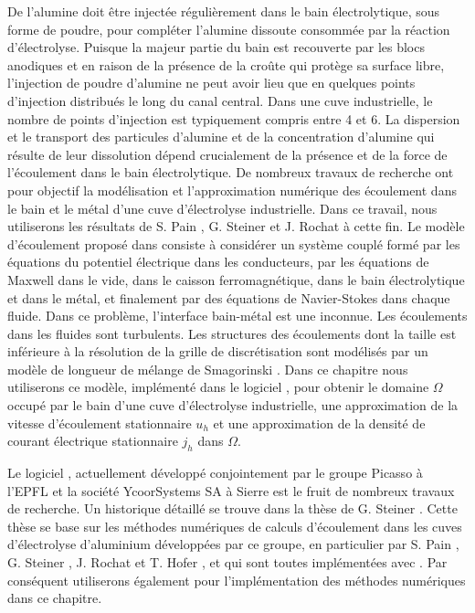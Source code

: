 De l'alumine doit être injectée régulièrement dans le bain
électrolytique, sous forme de poudre, pour compléter l'alumine
dissoute consommée par la réaction d'électrolyse. Puisque la majeur
partie du bain est recouverte par les blocs anodiques et en raison de
la présence de la croûte qui protège sa surface libre, l'injection de
poudre d'alumine ne peut avoir lieu que en quelques points d'injection
distribués le long du canal central. Dans une cuve industrielle, le
nombre de points d'injection est typiquement compris entre 4 et 6. La
dispersion et le transport des particules d'alumine et de la
concentration d'alumine qui résulte de leur dissolution dépend
crucialement de la présence et de la force de l'écoulement dans le
bain électrolytique. De nombreux travaux de recherche ont pour
objectif la modélisation et l'approximation numérique des écoulement
dans le bain et le métal d'une cuve d'électrolyse industrielle. Dans
ce travail, nous utiliserons les résultats de S. Pain \cite{Pain2006},
G. Steiner \cite{Steiner2009} et J. Rochat \cite{Rochat2016} à cette
fin. Le modèle d'écoulement proposé dans \cite{Steiner2009} consiste à
considérer un système couplé formé par les équations du potentiel
électrique dans les conducteurs, par les équations de Maxwell dans le
vide, dans le caisson ferromagnétique, dans le bain électrolytique et
dans le métal, et finalement par des équations de Navier-Stokes dans
chaque fluide. Dans ce problème, l'interface bain-métal est une
inconnue. Les écoulements dans les fluides sont turbulents. Les
structures des écoulements dont la taille est inférieure à la
résolution de la grille de discrétisation sont modélisés par un modèle
de longueur de mélange de Smagorinski \cite{Rochat2016}. Dans ce
chapitre nous utiliserons ce modèle, implémenté dans le logiciel
\citealucell{}, pour obtenir le domaine $\Omega$ occupé par le bain d'une
cuve d'électrolyse industrielle, une approximation de la vitesse
d'écoulement stationnaire $u_h$ et une approximation de la densité de
courant électrique stationnaire $j_h$ dans $\Omega$.

Le logiciel \alucell{}, actuellement développé conjointement par le
groupe Picasso à l'EPFL et la société YcoorSystems SA à Sierre est le
fruit de nombreux travaux de recherche. Un historique détaillé se
trouve dans la thèse de G. Steiner \cite{Steiner2009}. Cette thèse se
base sur les méthodes numériques de calculs d'écoulement dans les
cuves d'électrolyse d'aluminium développées par ce groupe, en
particulier par S. Pain \cite{Pain2006}, G. Steiner
\cite{Steiner2009}, J. Rochat \cite{Rochat2016} et T. Hofer
\cite{Hofer2011}, et qui sont toutes implémentées avec \alucell{}. Par
conséquent utiliserons également \alucell{} pour l'implémentation des
méthodes numériques dans ce chapitre.

